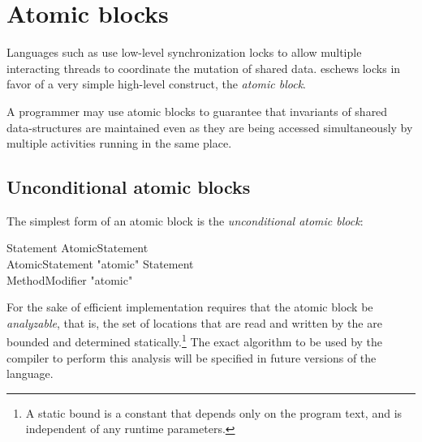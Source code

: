 \section{Atomic blocks}\label{AtomicBlocks}
Languages such as \java{} use low-level synchronization locks to allow
multiple interacting threads to coordinate the mutation of shared
data. \Xten{} eschews locks in favor of a very simple high-level
construct, the {\em atomic block}.

A programmer may use atomic blocks to guarantee that invariants of
shared data-structures are maintained even as they are being accessed
simultaneously by multiple activities running in the same place.

\subsection{Unconditional atomic blocks}
The simplest form of an atomic block is the {\em unconditional
atomic block}:

\begin{grammar}
Statement \: AtomicStatement \\
AtomicStatement \: \xcd"atomic"  Statement \\
MethodModifier \: \xcd"atomic" \\
\end{grammar}

For the sake of efficient implementation \XtenCurrVer{} requires
that the atomic block be {\em analyzable}, that is, the set of
locations that are read and written by the  are
bounded and determined statically.\footnote{A static bound is a constant
that depends only on the program text, and is independent 
of any runtime parameters. }
The exact algorithm to be used by
the compiler to perform this analysis will be specified in future
versions of the language.
\tbd{}

